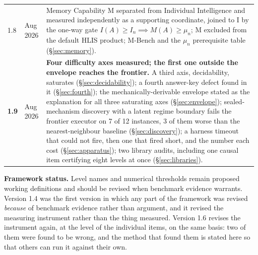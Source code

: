 \documentclass[11pt]{article}
\theoremstyle{definition}
\begin{document}
\begin{table}[h]
\begin{tabularx}{\textwidth}{@{}llY@{}}
1.8 & Aug 2026 & Memory Capability M separated from Individual Intelligence and measured independently as a supporting coordinate, joined to I by the one-way gate $I(A) \ge I_n \implies M(A) \ge \mu_n$; M excluded from the default HLIS product; M-Bench and the $\mu_n$ prerequisite table (\S\ref{sec:memory}). \\
\textbf{1.9} & Aug 2026 & \textbf{Four difficulty axes measured; the first one outside the envelope reaches the frontier.} A third axis, decidability, saturates (\S\ref{sec:decidability}); a fourth answer-key defect found in it (\S\ref{sec:fourth}); the mechanically-derivable envelope stated as the explanation for all three saturating axes (\S\ref{sec:envelope}); sealed-mechanism discovery with a latent regime boundary fails the frontier executor on 7 of 12 instances, 3 of them worse than the nearest-neighbour baseline (\S\ref{sec:discovery}); a harness timeout that could not fire, then one that fired short, and the number each cost (\S\ref{sec:apparatus}); two library audits, including one causal item certifying eight levels at once (\S\ref{sec:libraries}). \\
\bottomrule
\end{tabularx}
\end{table}

\vspace{1em}
\noindent\textbf{Framework status.} Level names and numerical thresholds remain proposed working definitions and should be revised when benchmark evidence warrants. Version 1.4 was the first version in which any part of the framework was revised \emph{because} of benchmark evidence rather than argument, and it revised the measuring instrument rather than the thing measured. Version 1.6 revises the instrument again, at the level of the individual items, on the same basis: two of them were found to be wrong, and the method that found them is stated here so that others can run it against their own.
\end{document}
